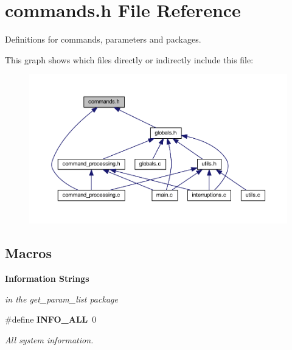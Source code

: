 \section{commands.\+h File Reference}
\label{commands_8h}


Definitions for commands, parameters and packages.  


This graph shows which files directly or indirectly include this file\+:
\nopagebreak
\begin{figure}[H]
\begin{center}
\leavevmode
\includegraphics[width=350pt]{commands_8h__dep__incl}
\end{center}
\end{figure}
\subsection*{Macros}
\begin{Indent}\textbf{ Information Strings}\par
{\em in the get\+\_\+param\+\_\+list package }\begin{DoxyCompactItemize}
\item 
\mbox{\label{commands_8h_a2ba44fc5b8a316bd307d0baa9ab629ef}} 
\#define \textbf{ I\+N\+F\+O\+\_\+\+A\+LL}~0
\begin{DoxyCompactList}\small\item\em All system information. \end{DoxyCompactList}\end{DoxyCompactItemize}
\end{Indent}
